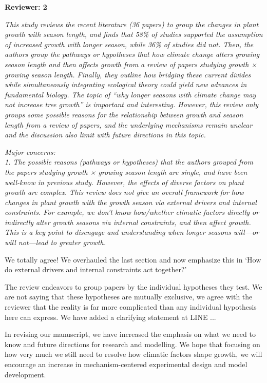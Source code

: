 \documentclass[11pt]{article}
\begin{document}
{\bf Reviewer: 2}


\emph{This study reviews the recent literature (36 papers) to group the changes in plant growth with season length, and finds that 58\% of studies supported the assumption of increased growth with longer season, while 36\% of studies did not. Then, the authors group the pathways or hypotheses that how climate change alters growing season length and then affects growth from a review of papers studying growth × growing season length. Finally, they outline how bridging these current divides while simultaneously integrating ecological theory could yield new advances in fundamental biology. The topic of “why longer seasons with climate change may not increase tree growth” is important and interesting. However, this review only groups some possible reasons for the relationship between growth and season length from a review of papers, and the underlying mechanisms remain unclear and the discussion also limit with future directions in this topic.}


\emph{Major concerns:}\\
\emph{1. The possible reasons (pathways or hypotheses) that the authors grouped from the papers studying growth × growing season length are single, and have been well-know in previous study. However, the effects of diverse factors on plant growth are complex. This review does not give an overall framework for how changes in plant growth with the growth season via external drivers and internal constraints. For example, we don’t know how/whether climatic factors directly or indirectly alter growth seasons via internal constraints, and then affect growth. This is a key point to disengage and understanding when longer seasons will—or will not—lead to greater growth.}

We totally agree! We overhauled the last section and now emphasize this in `How do external drivers and internal constraints act together?'

The review endeavors to group papers by the individual hypotheses they test. We are not saying that these hypotheses are mutually exclusive, we agree with the reviewer that the reality is far more complicated than any individual hypothesis here can express. We have added a clarifying statement at LINE  ... %

 In revising our manuscript, we have increased the emphasis on what we need to know and future directions for research and modelling. We hope that focusing on how very much we still need to resolve how climatic factors shape growth, we will encourage an increase in mechanism-centered experimental design and model development.\\
\end{document}
